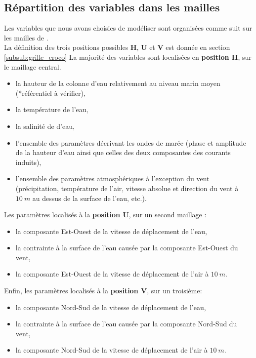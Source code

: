 \documentclass[10pt,a4paper,titlepage]{article}
\begin{document}
\subsection{Répartition des variables dans les mailles}
\label{anx:vars_dans_maillage}
Les variables que nous avons choisies de modéliser sont organisées comme suit sur les mailles de \cite{Arakawa_C-grid_1977}.\\
La définition des trois positions possibles \textbf{H}, \textbf{U} et \textbf{V} est donnée en section \ref{subsub:grille_croco}
La majorité des variables sont localisées en \textbf{position H}, sur le maillage central.
\begin{itemize}
    \item la hauteur de la colonne d'eau relativement au niveau marin moyen (*référentiel à vérifier),
    \item la température de l'eau,
    \item la salinité de d'eau,
    \item l'ensemble des paramètres décrivant les ondes de marée (phase et amplitude de la hauteur d'eau ainsi que celles des deux composantes des courants induits),
    \item l'ensemble des paramètres atmosphériques à l'exception du vent (précipitation, température de l'air, vitesse absolue et direction du vent à $10~m$ au dessus de la surface de l'eau, etc.).
\end{itemize}
Les paramètres localisés à la \textbf{position U}, sur un second maillage :
\begin{itemize}
    \item la composante Est-Ouest de la vitesse de déplacement de l'eau,
    \item la contrainte à la surface de l'eau causée par la composante Est-Ouest du vent,
    \item la composante Est-Ouest de la vitesse de déplacement de l'air à $10~m$.
\end{itemize}
Enfin, les paramètres localisés à la \textbf{position V}, sur un troisième:
\begin{itemize}
    \item la composante Nord-Sud de la vitesse de déplacement de l'eau,
    \item la contrainte à la surface de l'eau causée par la composante Nord-Sud du vent,
    \item la composante Nord-Sud de la vitesse de déplacement de l'air à $10~m$.
\end{itemize}
\end{document}
